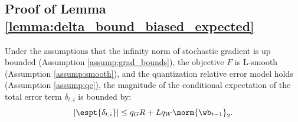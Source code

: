 \documentclass[11pt, letterpaper]{article}
\begin{document}
\subsection{Proof of Lemma \ref{lemma:delta_bound_biased_expected}}
\begin{lemma}
\label{lemma:delta_bound_biased_expected}
Under the assumptions that the infinity norm of stochastic gradient is up bounded (Assumption \ref{assump:grad_bounds}), the objective $F$ is L-smooth (Assumption \ref{assump:smooth}), and the quantization relative error model holds (Assumption \ref{assump:qe}), the magnitude of the conditional expectation of the total error term $\delta_{t,i}$ is bounded by:
$$
    |\espt{\delta_{t,i}}| \le q_GR + L q_W \norm{\wb_{t-1}}_2.
$$
\end{lemma}
\end{document}
